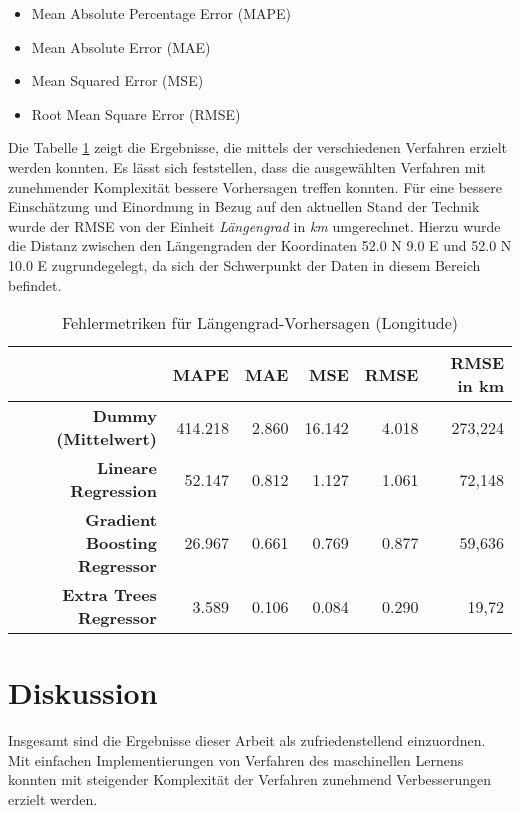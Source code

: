 \documentclass{svproc}
\begin{document}
\begin{itemize}
    \item Mean Absolute Percentage Error (MAPE)
    \item Mean Absolute Error (MAE)
    \item Mean Squared Error (MSE)
    \item Root Mean Square Error (RMSE)
\end{itemize}

Die Tabelle \ref{metriken} zeigt die Ergebnisse, die mittels der verschiedenen Verfahren erzielt werden konnten. Es lässt sich feststellen, dass die ausgewählten Verfahren mit zunehmender Komplexität bessere Vorhersagen treffen konnten.
Für eine bessere Einschätzung und Einordnung in Bezug auf den aktuellen Stand der Technik wurde der RMSE von der Einheit \textit{Längengrad} in \textit{km} umgerechnet. Hierzu wurde die Distanz zwischen den Längengraden der Koordinaten 52.0 N 9.0 E und 52.0 N 10.0 E zugrundegelegt, da sich der Schwerpunkt der Daten in diesem Bereich befindet.

\begin{table}[]
\centering
\caption{Fehlermetriken für Längengrad-Vorhersagen (Longitude)}
\label{tab:my-table}
\begin{tabular}{@{}r|r|r|r|r|r@{}}
\toprule
\textbf{}                            & \textbf{MAPE} & \textbf{MAE} & \textbf{MSE} & \textbf{RMSE} & \textbf{RMSE in km} \\ \midrule
\textbf{Dummy (Mittelwert)}          & 414.218       & 2.860        & 16.142       & 4.018         & 273,224    \\
\textbf{Lineare Regression}          & 52.147        & 0.812        & 1.127        & 1.061         & 72,148     \\
\textbf{Gradient Boosting Regressor} & 26.967        & 0.661        & 0.769        & 0.877         & 59,636     \\
\textbf{Extra Trees Regressor}       & 3.589         & 0.106        & 0.084        & 0.290         & 19,72      \\ \bottomrule
\end{tabular}
\label{metriken}
\end{table}

%
%
\section{Diskussion}

Insgesamt sind die Ergebnisse dieser Arbeit als zufriedenstellend einzuordnen. Mit einfachen Implementierungen von Verfahren des maschinellen Lernens konnten mit steigender Komplexität der Verfahren zunehmend Verbesserungen erzielt werden.
\end{document}

